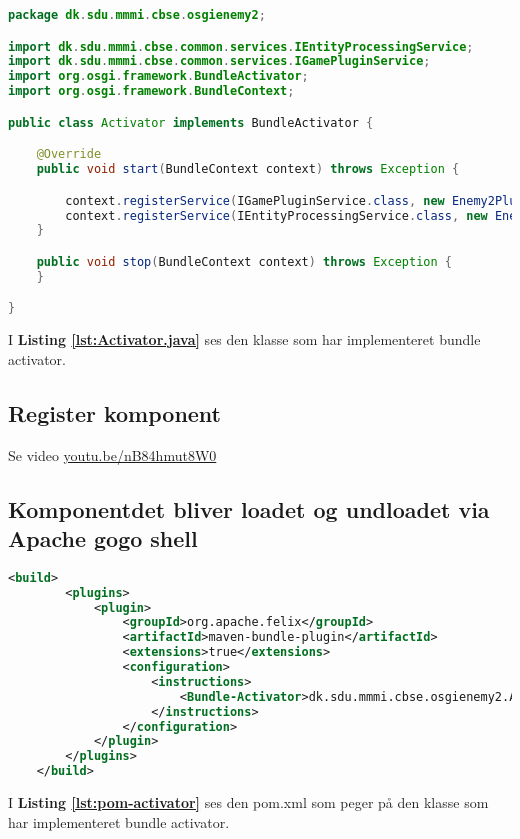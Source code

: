 
\begin{lstlisting}[caption={Activator.java}, label={lst:Activator.java}, language=java]
package dk.sdu.mmmi.cbse.osgienemy2;

import dk.sdu.mmmi.cbse.common.services.IEntityProcessingService;
import dk.sdu.mmmi.cbse.common.services.IGamePluginService;
import org.osgi.framework.BundleActivator;
import org.osgi.framework.BundleContext;

public class Activator implements BundleActivator {

    @Override
    public void start(BundleContext context) throws Exception {

        context.registerService(IGamePluginService.class, new Enemy2Plugin(), null);
        context.registerService(IEntityProcessingService.class, new Enemy2Processor(), null);
    }

    public void stop(BundleContext context) throws Exception {
    }

}
\end{lstlisting}

I \textbf{Listing \ref{lst:Activator.java}} ses den klasse som har implementeret
bundle activator.



\subsection{Register komponent}
Se video \href{https://www.youtube.com/watch?v=nB84hmut8W0}{youtu.be/nB84hmut8W0}

\subsection{Komponentdet bliver loadet og undloadet via Apache gogo shell}
\begin{lstlisting}[caption={pom.xml}, label={lst:pom-activator}, language=xml]
    <build>
        <plugins>
            <plugin>
                <groupId>org.apache.felix</groupId>
                <artifactId>maven-bundle-plugin</artifactId>
                <extensions>true</extensions>
                <configuration>
                    <instructions>
                        <Bundle-Activator>dk.sdu.mmmi.cbse.osgienemy2.Activator</Bundle-Activator>
                    </instructions>
                </configuration>
            </plugin>
        </plugins>
    </build>
\end{lstlisting}
I \textbf{Listing \ref{lst:pom-activator}} ses den pom.xml som peger på den
klasse som har implementeret bundle activator.


